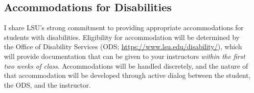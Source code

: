 \documentclass[11pt]{article}
\renewenvironment{leftbar}[1][\hsize]%
{%
	\def\FrameCommand%
	{%
		\texttt{[image: ../resources/idea.png]}%
		\fboxsep=\FrameSep\colorbox{cyan!5}%
	}%
	\MakeFramed{\hsize#1\advance\hsize-\width\FrameRestore}%
}%
{\endMakeFramed}
\begin{document}
%
%
%
%
%

\subsection*{Accommodations for Disabilities}
\footnotesize{I share LSU's strong commitment to providing appropriate accommodations for students with disabilities. Eligibility for accommodation will be determined by the Office of Disability Services (ODS; \url{https://www.lsu.edu/disability/}), which will provide documentation that can be given to your instructors \emph{within the first two weeks of class}. Accommodations will be handled discretely, and the nature of that accommodation will be developed through active dialog between the student, the ODS, and the instructor.}
\end{document}

